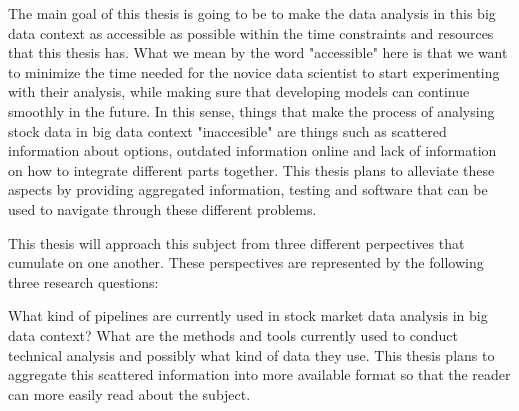 The main goal of this thesis is going to be to make the data analysis in this big data context as accessible as possible within the time constraints and resources that this thesis has.
What we mean by the word "accessible" here is that we want to minimize the time needed for the novice data scientist to start experimenting with their analysis, while making sure that developing models can continue smoothly in the future.
In this sense, things that make the process of analysing stock data in big data context "inaccesible" are things such as scattered information about options, outdated information online and lack of information on how to integrate different parts together.
This thesis plans to alleviate these aspects by providing aggregated information, testing and software that can be used to navigate through these different problems.



This thesis will approach this subject from three different perpectives that cumulate on one another.
These perspectives are represented by the following three research questions:

What kind of pipelines are currently used in stock market data analysis in big data context?
What are the methods and tools currently used to conduct technical analysis and possibly what kind of data they use.
This thesis plans to aggregate this scattered information into more available format so that the reader can more easily read about the subject.

